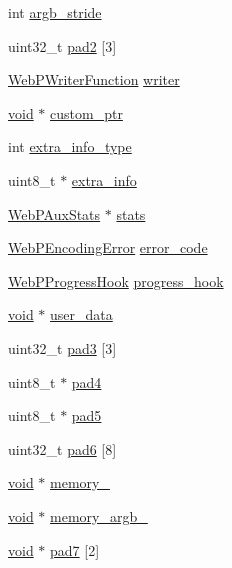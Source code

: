\begin{DoxyCompactItemize}
\item 
int \mbox{\hyperlink{struct_web_p_picture_ac955e0d373548f0c541feb2485c0c13a}{argb\+\_\+stride}}
\item 
uint32\+\_\+t \mbox{\hyperlink{struct_web_p_picture_a04eb477a2e0e0895691a59895b156af8}{pad2}} \mbox{[}3\mbox{]}
\item 
\mbox{\hyperlink{encode_8h_a09d500b8d73b44534f63ed6f16a68358}{Web\+P\+Writer\+Function}} \mbox{\hyperlink{struct_web_p_picture_ae28d9b1c516932e230ec1a031ce368ce}{writer}}
\item 
\mbox{\hyperlink{_s_d_l__opengles2__gl2ext_8h_ae5d8fa23ad07c48bb609509eae494c95}{void}} $\ast$ \mbox{\hyperlink{struct_web_p_picture_ab52a1e67bc47eb782ab846edbe9504f3}{custom\+\_\+ptr}}
\item 
int \mbox{\hyperlink{struct_web_p_picture_a66e5d4a176d281c0ac3a9fa4d1cdb1ae}{extra\+\_\+info\+\_\+type}}
\item 
uint8\+\_\+t $\ast$ \mbox{\hyperlink{struct_web_p_picture_a869dd7bfe02026edbc6855ea662edf48}{extra\+\_\+info}}
\item 
\mbox{\hyperlink{struct_web_p_aux_stats}{Web\+P\+Aux\+Stats}} $\ast$ \mbox{\hyperlink{struct_web_p_picture_a7da1a6c4953bdf7ed2c1aba6d8af5956}{stats}}
\item 
\mbox{\hyperlink{encode_8h_ac00eb4f74182805d226941f19df60243}{Web\+P\+Encoding\+Error}} \mbox{\hyperlink{struct_web_p_picture_a9bea0d4fcc23a950e4d40f980b7a4b45}{error\+\_\+code}}
\item 
\mbox{\hyperlink{encode_8h_abb01f38a3187a4a225dc4456ec14acaa}{Web\+P\+Progress\+Hook}} \mbox{\hyperlink{struct_web_p_picture_a527ac4ef1fc0963b52d9573dddecc1de}{progress\+\_\+hook}}
\item 
\mbox{\hyperlink{_s_d_l__opengles2__gl2ext_8h_ae5d8fa23ad07c48bb609509eae494c95}{void}} $\ast$ \mbox{\hyperlink{struct_web_p_picture_aca441ad043004158d3cb14570247ca36}{user\+\_\+data}}
\item 
uint32\+\_\+t \mbox{\hyperlink{struct_web_p_picture_a746b6fce2fb6239117e1c0e34dc434a9}{pad3}} \mbox{[}3\mbox{]}
\item 
uint8\+\_\+t $\ast$ \mbox{\hyperlink{struct_web_p_picture_a4f96b82d72cfc58d27cc4b6a8f7df7e2}{pad4}}
\item 
uint8\+\_\+t $\ast$ \mbox{\hyperlink{struct_web_p_picture_a85e1dc0c49810c5cf94b5d5adf204b5e}{pad5}}
\item 
uint32\+\_\+t \mbox{\hyperlink{struct_web_p_picture_af76de31db87d32fd4de2f3d5446190cc}{pad6}} \mbox{[}8\mbox{]}
\item 
\mbox{\hyperlink{_s_d_l__opengles2__gl2ext_8h_ae5d8fa23ad07c48bb609509eae494c95}{void}} $\ast$ \mbox{\hyperlink{struct_web_p_picture_a5268908af2a7abc99cc1f4e256309eaf}{memory\+\_\+}}
\item 
\mbox{\hyperlink{_s_d_l__opengles2__gl2ext_8h_ae5d8fa23ad07c48bb609509eae494c95}{void}} $\ast$ \mbox{\hyperlink{struct_web_p_picture_a174ea809a6be39363b58b968a54d17c4}{memory\+\_\+argb\+\_\+}}
\item 
\mbox{\hyperlink{_s_d_l__opengles2__gl2ext_8h_ae5d8fa23ad07c48bb609509eae494c95}{void}} $\ast$ \mbox{\hyperlink{struct_web_p_picture_a8e8ad4f84038d65d3df5a498472b12ce}{pad7}} \mbox{[}2\mbox{]}
\end{DoxyCompactItemize}
